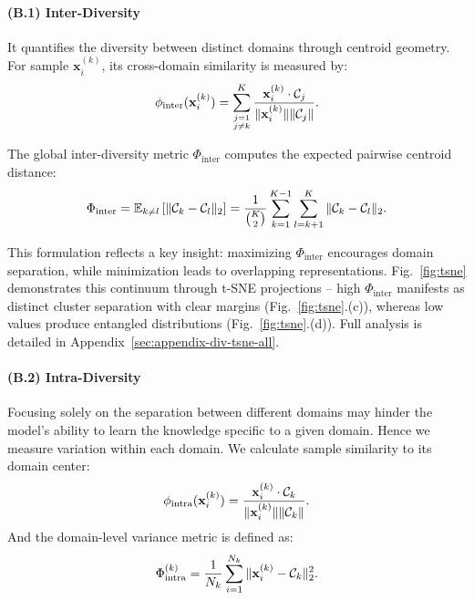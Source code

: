 \paragraph{(B.1) Inter-Diversity} 
It quantifies the diversity between distinct domains through centroid geometry. For sample \( \mathbf{x}_i^{(k)} \), its cross-domain similarity is measured by:
\begin{equation}
\small
\phi_{\text{inter}}(\mathbf{x}_i^{(k)}) = \sum_{\substack{j=1 \\ j \neq k}}^K \frac{\mathbf{x}_i^{(k)} \cdot \mathcal{C}_j}{\|\mathbf{x}_i^{(k)}\| \|\mathcal{C}_j\|}.
\end{equation}

The global inter-diversity metric \( \Phi_{\text{inter}} \) computes the expected pairwise centroid distance: 
\begin{equation}
\small
\label{eq:inter-diversity}
\Phi_{\text{inter}} = \mathbb{E}_{k \neq l} \left[ \|\mathcal{C}_k - \mathcal{C}_l\|_2 \right] = \frac{1}{\binom{K}{2}} \sum_{k=1}^{K-1} \sum_{l=k+1}^K \|\mathcal{C}_k - \mathcal{C}_l\|_2.
\end{equation}

This formulation reflects a key insight: maximizing \( \Phi_{\text{inter}} \) encourages domain separation, while minimization leads to overlapping representations. Fig.~\ref{fig:tsne} demonstrates this continuum through t-SNE projections – high \( \Phi_{\text{inter}} \) manifests as distinct cluster separation with clear margins (Fig.~\ref{fig:tsne}.(c)), whereas low values produce entangled distributions (Fig.~\ref{fig:tsne}.(d)). Full analysis is detailed in Appendix~\ref{sec:appendix-div-tsne-all}.


\paragraph{(B.2) Intra-Diversity}

Focusing solely on the separation between different domains may hinder the model's ability to learn the knowledge specific to a given domain. Hence we measure variation within each domain. We calculate sample similarity to its domain center:
\begin{equation}
\small
\phi_{\text{intra}}(\mathbf{x}_i^{(k)}) = \frac{\mathbf{x}_i^{(k)} \cdot \mathcal{C}_k}{\|\mathbf{x}_i^{(k)}\| \|\mathcal{C}_k\|}.
\end{equation}
And the domain-level variance metric is defined as:
\begin{equation}
\small
\label{eq:intra-diversity}
\Phi_{\text{intra}}^{(k)} = \frac{1}{N_k} \sum_{i=1}^{N_k} \|\mathbf{x}_i^{(k)} - \mathcal{C}_k\|_2^2.
\end{equation}

